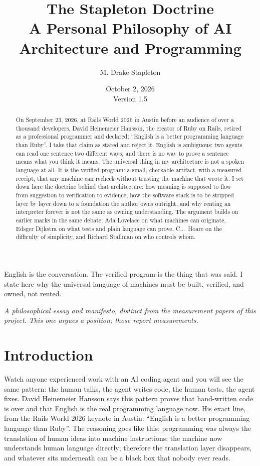 \documentclass[11pt]{article}
\title{The Stapleton Doctrine\\[0.4em]\large A Personal Philosophy of AI
Architecture and Programming}
\author{M. Drake Stapleton}
\date{October 2, 2026\\ \small Version 1.5}
\begin{document}
\maketitle

\begin{center}
\small English is the conversation. The verified program is the thing that
was said. I state here why the universal language of machines must be
built, verified, and owned, not rented.
\end{center}

\begin{center}
\small \textit{A philosophical essay and manifesto, distinct from the
measurement papers of this project. This one argues a position; those
report measurements.}
\end{center}

\begin{abstract}
On September 23, 2026, at Rails World 2026 in Austin before an audience
of over a thousand developers, David Heinemeier Hansson, the creator of
Ruby on Rails, retired as a professional programmer and declared:
``English is a better programming language than Ruby''\cite{dhh-keynote}.
I take that claim as stated and reject it. English is
ambiguous; two agents can read one sentence two different ways; and
there is no way to prove a sentence means what you think it means.
The universal thing in my architecture is not a spoken
language at all. It is the verified program: a small, checkable
artifact, with a measured receipt, that any machine can recheck
without trusting the machine that wrote it. I set down here the
doctrine behind that architecture: how meaning is supposed to flow
from suggestion to verification to evidence, how the software stack is
to be stripped layer by layer down to a foundation the author owns
outright, and why renting an interpreter forever is not the same as
owning understanding. The argument builds on earlier marks in the same
debate: Ada Lovelace on what machines can originate, Edsger Dijkstra
on what tests and plain language can prove, C.\@A.\@R.\ Hoare on the
difficulty of simplicity, and Richard Stallman on who controls whom.
\end{abstract}

\section{Introduction}

Watch anyone experienced work with an AI coding agent and you will see
the same pattern: the human talks, the agent writes code, the human
tests, the agent fixes. David Heinemeier Hansson says this pattern
proves that hand-written code is over and that English is the real
programming language now. His exact line, from the Rails World 2026
keynote in Austin: ``English is a better programming language than
Ruby''\cite{dhh-keynote}. The reasoning goes like this: programming
was always the translation of human ideas into machine instructions;
the machine now understands human language directly; therefore the
translation layer disappears, and whatever sits underneath can be a
black box that nobody ever reads.
\end{document}
